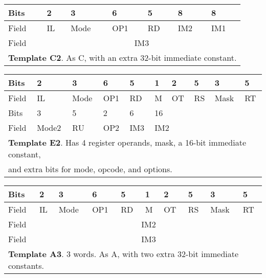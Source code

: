 \documentclass[forwardcom.tex]{subfiles}
\begin{document}
\begin{table}[h!] \label{table:templateC2}
\vv 
\begin{tabular}{|p{10mm}|p{10mm}|p{10mm}|p{10mm}|p{10mm}|p{38.5mm}|p{24mm}|} \hline
 Bits & 2 & 3 & 6 & 5 & \hspace{15mm} 8 & \hspace{8mm} 8 \\ \hline
Field & IL & Mode & OP1 & RD & \hspace{14mm} IM2 & \hspace{7mm} IM1 \\ \hline
Field & \multicolumn{6}{|c|}{ IM3 } \\ \hline
\multicolumn{7}{|l|}{
\textbf{Template C2}. As C, with an extra 32-bit immediate constant.} \\ \hline
\end{tabular}
\end{table}
\vv

\begin{table}[h!] \label{table:templateE2}
\vv 
\begin{tabular}{|p{10mm}|p{10mm}|p{10mm}|p{10mm}|p{10mm}|p{10mm}|p{10mm}|p{10mm}|p{10mm}|p{10mm}|} \hline
Bits & 2 & 3 & 6 & 5 & 1 & 2 & 5 & 3 & 5 \\ \hline
Field & IL & Mode & OP1 & RD & M & OT & RS & Mask & RT  \\ \hline
Bits & 3 & 5 & 2 & 6 & \multicolumn{5}{l|}{ \hspace{29mm} 16  } \\ \hline
Field  & Mode2 & RU & OP2 & IM3 & \multicolumn{5}{l|}{ \hspace{28mm} IM2 } \\ \hline
\multicolumn{10}{|l|}{
\textbf{Template E2}. Has 4 register operands, mask, a 16-bit immediate constant, } \\
\multicolumn{10}{|l|}{
and extra bits for mode, opcode, and options. } \\ \hline
\end{tabular}
\end{table}
\vv

\begin{table}[h!] \label{table:templateA3}
\vv
\begin{tabular}{|p{10mm}|p{10mm}|p{10mm}|p{10mm}|p{10mm}|p{10mm}|p{10mm}|p{10mm}|p{10mm}|p{10mm}|} \hline
 Bits & 2 & 3 & 6 & 5 & 1 & 2 & 5 & 3 & 5 \\ \hline
Field & IL & Mode & OP1 & RD & M & OT & RS & Mask & RT  \\ \hline
Field & \multicolumn{9}{|c|}{ IM2 } \\ \hline
Field & \multicolumn{9}{|c|}{ IM3 } \\ \hline
\multicolumn{10}{|l|}{
\textbf{Template A3}. 3 words. As A, with two extra 32-bit immediate constants.
} \\ \hline
\end{tabular}
\end{table}
\vv
\end{document}

